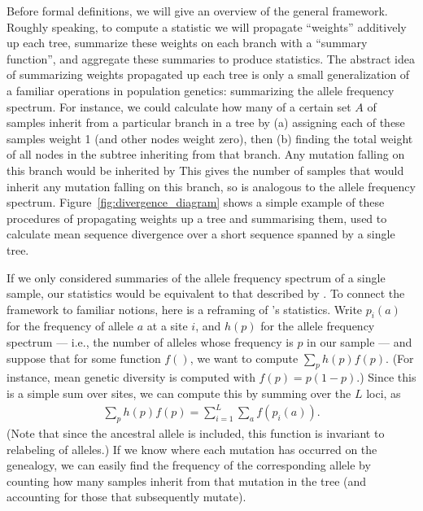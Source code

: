 \documentclass{article}
\begin{document}
Before formal definitions, we will give an overview of the general framework.
Roughly speaking, to compute a statistic we will
propagate ``weights'' additively up each tree,
summarize these weights on each branch with a ``summary function'',
and aggregate these summaries to produce statistics.
The abstract idea of summarizing weights propagated up each tree
is only a small generalization of a familiar operations in population genetics:
summarizing the allele frequency spectrum.
For instance, we could calculate how many of a certain set $A$ of samples
inherit from a particular branch in a tree
by (a) assigning each of these samples weight 1 (and other nodes weight zero), then
(b) finding the total weight of all nodes in the subtree inheriting from that branch.
Any mutation falling on this branch would be inherited by
This gives the number of samples that would inherit any mutation falling on this branch,
so is analogous to the allele frequency spectrum.
Figure~\ref{fig:divergence_diagram} shows a simple example of these procedures
of propagating weights up a tree and summarising them,
used to calculate mean sequence divergence over a short sequence spanned by a single tree.

If we only considered summaries of the allele frequency spectrum of a single sample,
our statistics would be equivalent to that described by \citet{fu1995statistical}.
To connect the framework to familiar notions,
here is a reframing of \citeauthor{fu1995statistical}'s statistics.
Write $p_i(a)$ for the frequency of allele $a$ at a site $i$,
and $h(p)$ for the allele frequency spectrum
--- i.e., the number of alleles whose frequency is $p$ in our sample ---
and suppose that for some function $f()$, we want to compute $\sum_p h(p) f(p)$.
(For instance, mean genetic diversity is computed with $f(p) = p (1-p)$.)
Since this is a simple sum over sites,
we can compute this by summing over the $L$ loci, as
\begin{align*}
    \sum_p h(p) f(p) = \sum_{i=1}^L \sum_a f(p_i(a)).
\end{align*}
(Note that since the ancestral allele is included, this function is invariant to relabeling of alleles.)
If we know where each mutation has occurred on the genealogy,
we can easily find the frequency of the corresponding allele by counting how many samples
inherit from that mutation in the tree (and accounting for those that subsequently mutate).
\end{document}
